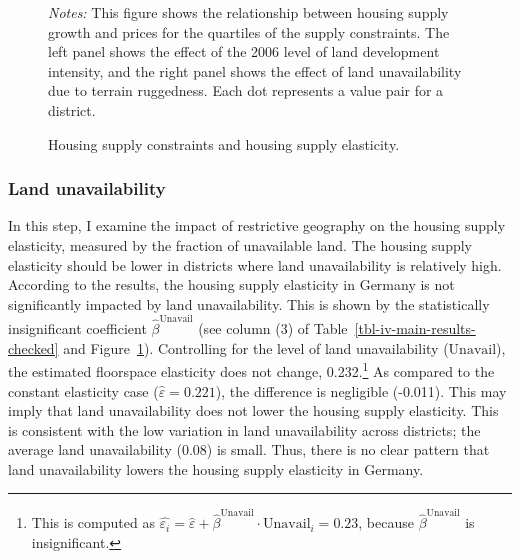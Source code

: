 \documentclass[
  12pt,
]{article}
\begin{document}
\begin{figure}
\begin{minipage}{0.50\linewidth}
{}


\end{minipage}%

\caption{\label{fig-supply-constraints-elasticity}Housing supply
constraints and housing supply
elasticity.}
\begin{minipage}{0.975\textwidth}
\small
\emph{Notes:} This figure shows
the relationship between housing supply growth and prices for the
quartiles of the supply constraints. The left panel shows the effect of
the 2006 level of land development intensity, and the right panel shows
the effect of land unavailability due to terrain ruggedness. Each dot
represents a value pair for a
district.
\end{minipage}


\end{figure}%

\subsubsection*{Land unavailability}\label{land-unavailability}

In this step, I examine the impact of restrictive geography on the
housing supply elasticity, measured by the fraction of unavailable land.
The housing supply elasticity should be lower in districts where land
unavailability is relatively high. According to the results, the housing
supply elasticity in Germany is not significantly impacted by land
unavailability. This is shown by the statistically insignificant
coefficient \(\widehat{\beta}^{\text{Unavail}}\) (see column (3) of
Table~\ref{tbl-iv-main-results-checked} and
Figure~\ref{fig-supply-constraints-elasticity}). Controlling for the
level of land unavailability (\(\text{Unavail}\)), the estimated
floorspace elasticity does not change, 0.232.\footnote{This is computed
  as
  \(\widehat{\varepsilon_i} =\widehat{\varepsilon} + \widehat{\beta}^{\text{Unavail}}\cdot\text{Unavail}_i = 0.23\),
  because \(\widehat{\beta}^{\text{Unavail}}\) is insignificant.} As
compared to the constant elasticity case
(\(\widehat{\varepsilon}=0.221\)), the difference is negligible
(-0.011). This may imply that land unavailability does not lower the
housing supply elasticity. This is consistent with the low variation in
land unavailability across districts; the average land unavailability
(0.08) is small. Thus, there is no clear pattern that land
unavailability lowers the housing supply elasticity in Germany.
\end{document}

